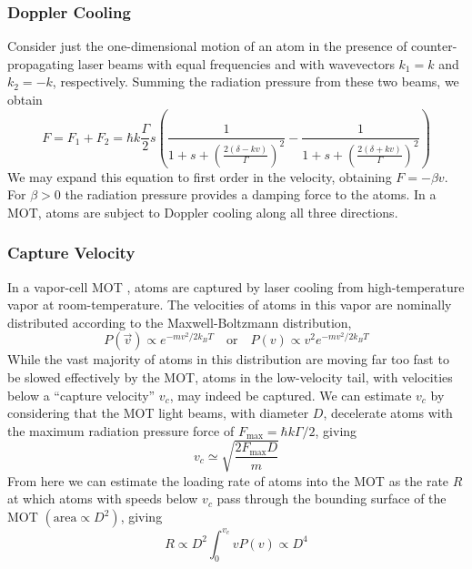\documentclass{../lab}
\begin{document}
\subsubsection{Doppler Cooling}


Consider just the one-dimensional motion of an atom in the presence of counter-propagating laser beams with equal frequencies and with wavevectors $k_1 = k$ and $k_2 = -k$, respectively. Summing the radiation pressure from these two beams, we obtain
\begin{equation}
    F = F_1 + F_2 = \hbar k \frac{\Gamma}{2}s\left(\frac{1}{1+s+\left(\frac{2(\delta-kv)}{\Gamma}\right)^2}-\frac{1}{1+s+\left(\frac{2(\delta+kv)}{\Gamma}\right)^2}\right)
\end{equation}
We may expand this equation to first order in the velocity, obtaining $F = -\beta v$. For $\beta > 0$ the radiation pressure provides a damping force to the atoms. In a MOT, atoms are subject to Doppler cooling along all three directions.

\subsubsection{Capture Velocity}
\label{subsubsec:CaptureVelocity}

In a vapor-cell MOT \cite{Monroe}, atoms are captured by laser cooling from high-temperature vapor at room-temperature. The velocities of atoms in this vapor are nominally distributed according to the Maxwell-Boltzmann distribution,
\begin{equation}
    P(\vec{v}) \propto e^{-mv^2/2 k_B T}
    \quad \text{or} \quad
    P(v) \propto v^2e^{-mv^2/2 k_B T}
\end{equation}
While the vast majority of atoms in this distribution are moving far too fast to be slowed effectively by the MOT, atoms in the low-velocity tail, with velocities below a ``capture velocity'' $v_c$, may indeed be captured. We can estimate $v_c$ by considering that the MOT light beams, with diameter $D$, decelerate atoms with the maximum radiation pressure force of $F_\text{max} = \hbar k \Gamma/2$, giving
\begin{equation}
    v_c \simeq \sqrt{\frac{2F_\text{max}D}{m}}
\end{equation}
From here we can estimate the loading rate of atoms into the MOT as the rate $R$ at which atoms with speeds below $v_c$ pass through the bounding surface of the MOT $\left(\text{area} \propto D^2\right)$, giving
\begin{equation}
    R \propto D^2 \int_0^{v_c} v P(v) \propto D^4
\end{equation}
\end{document}
